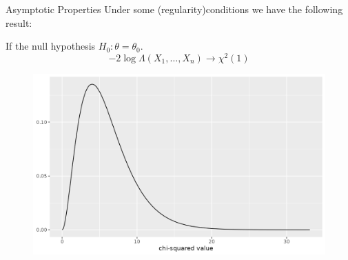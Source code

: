 \documentclass{beamer}
\begin{document}
\begin{frame}{Asymptotic Properties}
	Under some (regularity)conditions we have the following result:
	
	If the null hypothesis $H_0\colon \theta= \theta_0$.
	\begin{equation*}
		-2 \log \Lambda(X_1,\ldots, X_n) \to \chi^2(1)
	\end{equation*}
	\begin{figure}[h]
		\centering
			\includegraphics[scale=0.45]{../Figures/fig_chi_square1.png}
	\end{figure}
	
	
\end{frame}
\end{document}
